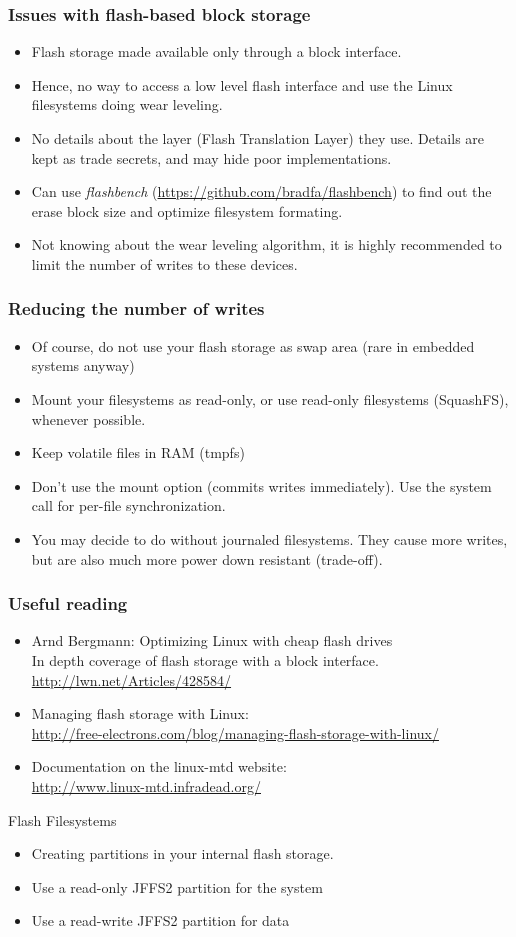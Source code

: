 \begin{frame}
  \frametitle{Issues with flash-based block storage}
  \begin{itemize}
  \item Flash storage made available only through a block interface.
  \item Hence, no way to access a low level flash interface
    and use the Linux filesystems doing wear leveling.
  \item No details about the layer (Flash Translation Layer) they
    use. Details are kept as trade secrets, and may hide poor
    implementations. 
  \item Can use {\em flashbench}
        (\url{https://github.com/bradfa/flashbench}) to find out
        the erase block size and optimize filesystem formating.
  \item Not knowing about the wear leveling algorithm,
        it is highly recommended to limit the number of writes
        to these devices.
  \end{itemize}
\end{frame}

\begin{frame}
  \frametitle{Reducing the number of writes}
  \begin{itemize}
  \item Of course, do not use your flash storage as swap area (rare in
    embedded systems anyway)
  \item Mount your filesystems as read-only, or use read-only
    filesystems (SquashFS), whenever possible.
  \item Keep volatile files in RAM (tmpfs)
  \item Don't use the  mount option (commits writes
    immediately). Use the  system call for per-file
    synchronization.
  \item You may decide to do without journaled filesystems. They cause
    more writes, but are also much more power down resistant
    (trade-off).
  \end{itemize}
\end{frame}

\begin{frame}
  \frametitle{Useful reading}
  \begin{itemize}
  \item Arnd Bergmann: Optimizing Linux with cheap flash drives\\
    In depth coverage of flash storage with a block interface.\\
    \url{http://lwn.net/Articles/428584/}
  \item Managing flash storage with Linux:\\
    \url{http://free-electrons.com/blog/managing-flash-storage-with-linux/}
  \item Documentation on the linux-mtd website:\\
    \url{http://www.linux-mtd.infradead.org/}
  \end{itemize}
\end{frame}

\setuplabframe
{Flash Filesystems}
{
  \begin{itemize}
  \item Creating partitions in your internal flash storage.
  \item Use a read-only JFFS2 partition for the system
  \item Use a read-write JFFS2 partition for data
  \end{itemize}
}
